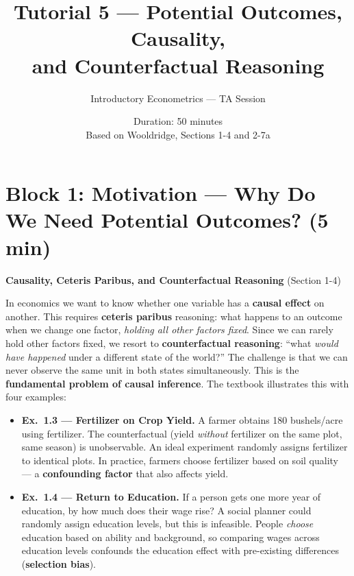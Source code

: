 \documentclass[11pt,a4paper]{article}
\title{\textbf{Tutorial 5 --- Potential Outcomes, Causality,\\ and Counterfactual Reasoning}}
\author{Introductory Econometrics --- TA Session}
\date{Duration: 50 minutes \\ \medskip \small Based on Wooldridge, Sections 1-4 and 2-7a}
\begin{document}
\maketitle
\thispagestyle{empty}

\section{Block 1: Motivation --- Why Do We Need Potential Outcomes? \textnormal{(5 min)}}

\begin{bookexample}
\textbf{\color{blockcolor}Causality, Ceteris Paribus, and Counterfactual Reasoning} {\small (Section 1-4)}

\smallskip
In economics we want to know whether one variable has a \textbf{causal effect} on another. This requires \textbf{ceteris paribus} reasoning: what happens to an outcome when we change one factor, \emph{holding all other factors fixed}. Since we can rarely hold other factors fixed, we resort to \textbf{counterfactual reasoning}: ``what \emph{would have happened} under a different state of the world?'' The challenge is that we can never observe the same unit in both states simultaneously. This is the \textbf{fundamental problem of causal inference}. The textbook illustrates this with four examples:

\smallskip
\begin{itemize}[leftmargin=1.5em,itemsep=3pt]
  \item \textbf{Ex.~1.3 --- Fertilizer on Crop Yield.} A farmer obtains 180 bushels/acre using fertilizer. The counterfactual (yield \emph{without} fertilizer on the same plot, same season) is unobservable. An ideal experiment randomly assigns fertilizer to identical plots. In practice, farmers choose fertilizer based on soil quality --- a \textbf{confounding factor} that also affects yield.

  \item \textbf{Ex.~1.4 --- Return to Education.} If a person gets one more year of education, by how much does their wage rise? A social planner could randomly assign education levels, but this is infeasible. People \emph{choose} education based on ability and background, so comparing wages across education levels confounds the education effect with pre-existing differences (\textbf{selection bias}).


\end{itemize}
\end{bookexample}
\end{document}
